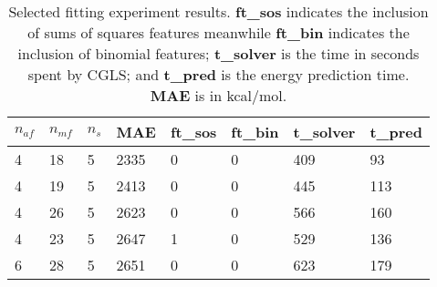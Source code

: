 \documentclass[12pt]{article}
\begin{document}
\begin{table}[H]
	\centering
	\caption{Selected fitting experiment results. \textbf{ft\_sos} indicates the inclusion of sums of squares features meanwhile \textbf{ft\_bin} indicates the inclusion of binomial features; \textbf{t\_solver} is the time in seconds spent by CGLS; and \textbf{t\_pred} is the energy prediction time. \textbf{MAE} is in kcal/mol.}
	\begin{tabular}{|l|l|l|l|l|l|l|l|}
		\hline
		\multicolumn{1}{|c|}{\textbf{$n_{af}$}} & \multicolumn{1}{c|}{\textbf{$n_{mf}$}} & \multicolumn{1}{c|}{\textbf{$n_s$}} &\multicolumn{1}{c|}{\textbf{MAE}} & \multicolumn{1}{c|}{\textbf{ft\_sos}} & \multicolumn{1}{c|}{\textbf{ft\_bin}} & \multicolumn{1}{c|}{\textbf{t\_solver}} & \multicolumn{1}{c|}{\textbf{t\_pred}} \\ \hline
		4                                    & 18                                  & 5                                      & 2335                        & 0                                     & 0                                     & 409                                   & 93                                  \\ \hline
		4                                    & 19                                  & 5                                      & 2413                        & 0                                     & 0                                     & 445                                   & 113                                 \\ \hline
		4                                    & 26                                  & 5                                      & 2623                        & 0                                     & 0                                     & 566                                   & 160                                 \\ \hline
		4                                    & 23                                  & 5                                      & 2647                        & 1                                     & 0                                     & 529                                   & 136                                 \\ \hline
		6                                    & 28                                  & 5                                      & 2651                        & 0                                     & 0                                     & 623                                   & 179                                 \\ \hline
	\end{tabular}
	\label{tab:shepard_exp}
\end{table}
\end{document}
